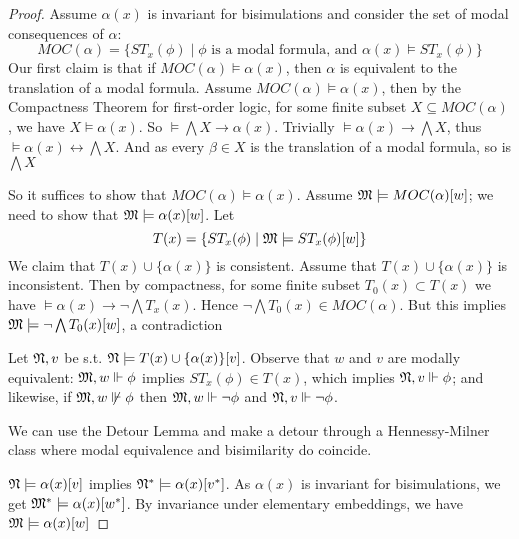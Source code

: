 \documentclass[11pt]{article}
\begin{document}
\begin{proof}
Assume \(\alpha(x)\) is invariant for bisimulations and consider the set of modal
consequences of \(\alpha\):
\begin{equation*}
MOC(\alpha)=\{ST_x(\phi)\mid\phi\text{ is a modal formula, and }\alpha(x)\models ST_x(\phi)\}
\end{equation*}
Our first claim is that if \(MOC(\alpha)\models\alpha(x)\), then \(\alpha\) is
equivalent to the translation of a modal formula.  Assume
\(MOC(\alpha)\models\alpha(x)\), then by the Compactness Theorem for first-order
logic, for some finite subset \(X\subseteq MOC(\alpha)\), we have
\(X\models\alpha(x)\). So \(\models\bigwedge X\to\alpha(x)\). Trivially
\(\models\alpha(x)\to\bigwedge X\), thus
\(\models\alpha(x)\leftrightarrow\bigwedge X\). And as every \(\beta\in X\)
is the translation of a modal formula, so is \(\bigwedge X\)

So it suffices to show that \(MOC(\alpha)\models\alpha(x)\). Assume
\(\mathfrak{M}\models
    MOC(\alpha)[w]\); we need to show that \(\mathfrak{M}\models\alpha(x)[w]\). Let
\begin{equation*}
T(x)=\{ST_x(\phi)\mid\mathfrak{M}\models ST_x(\phi)[w]\}
\end{equation*}
We claim that \(T(x)\cup\{\alpha(x)\}\) is consistent. Assume that
\(T(x)\cup\{\alpha(x)\}\) is inconsistent. Then by compactness, for some finite
subset \(T_0(x)\subset T(x)\) we have \(\models\alpha(x)\to\neg\bigwedge
    T_x(x)\). Hence \(\neg\bigwedge T_0(x)\in MOC(\alpha)\). But this implies
\(\mathfrak{M}\models\neg\bigwedge T_0(x)[w]\), a contradiction

Let \(\mathfrak{N},v\) be s.t. \(\mathfrak{N}\models T(x)\cup\{\alpha(x)\}[v]\). Observe that \(w\)
and \(v\) are modally equivalent: \(\mathfrak{M},w\Vdash\phi\) implies \(ST_x(\phi)\in
    T(x)\), which implies \(\mathfrak{N},v\Vdash\phi\); and likewise, if
\(\mathfrak{M},w\not\Vdash\phi\) then \(\mathfrak{M},w\Vdash\neg\phi\) and
\(\mathfrak{N},v\Vdash\neg\phi\).


We can use the Detour Lemma and make a detour through a Hennessy-Milner
class where modal equivalence and bisimilarity do coincide.
\begin{center}
\end{center}
\(\mathfrak{N}\models\alpha(x)[v]\) implies \(\mathfrak{N}^*\models\alpha(x)[v^*]\). As
\(\alpha(x)\) is invariant for bisimulations, we get
\(\mathfrak{M}^*\models\alpha(x)[w^*]\). By invariance under elementary embeddings,
we have \(\mathfrak{M}\models\alpha(x)[w]\)
\end{proof}
\end{document}
